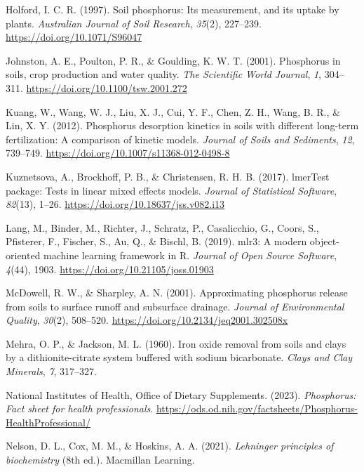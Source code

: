 \documentclass[
  a4paper,
]{article}
\newlength{\cslhangindent}
\newenvironment{CSLReferences}[2] %
 {\begin{list}{}{%
  \setlength{\itemindent}{0pt}
  \setlength{\leftmargin}{0pt}
  \setlength{\parsep}{0pt}
  \ifodd #1
   \setlength{\leftmargin}{\cslhangindent}
   \setlength{\itemindent}{-1\cslhangindent}
  \fi
  \setlength{\itemsep}{#2\baselineskip}}}
 {\end{list}}
\begin{document}
\begin{CSLReferences}{1}{0}
Holford, I. C. R. (1997). Soil phosphorus: Its measurement, and its
uptake by plants. \emph{Australian Journal of Soil Research},
\emph{35}(2), 227--239. \url{https://doi.org/10.1071/S96047}

Johnston, A. E., Poulton, P. R., \& Goulding, K. W. T. (2001).
Phosphorus in soils, crop production and water quality. \emph{The
Scientific World Journal}, \emph{1}, 304--311.
\url{https://doi.org/10.1100/tsw.2001.272}

Kuang, W., Wang, W. J., Liu, X. J., Cui, Y. F., Chen, Z. H., Wang, B.
R., \& Lin, X. Y. (2012). Phosphorus desorption kinetics in soils with
different long-term fertilization: A comparison of kinetic models.
\emph{Journal of Soils and Sediments}, \emph{12}, 739--749.
\url{https://doi.org/10.1007/s11368-012-0498-8}

Kuznetsova, A., Brockhoff, P. B., \& Christensen, R. H. B. (2017).
lmerTest package: Tests in linear mixed effects models. \emph{Journal of
Statistical Software}, \emph{82}(13), 1--26.
\url{https://doi.org/10.18637/jss.v082.i13}

Lang, M., Binder, M., Richter, J., Schratz, P., Casalicchio, G., Coors,
S., Pfisterer, F., Fischer, S., Au, Q., \& Bischl, B. (2019). {mlr3}: A
modern object-oriented machine learning framework in {R}. \emph{Journal
of Open Source Software}, \emph{4}(44), 1903.
\url{https://doi.org/10.21105/joss.01903}

McDowell, R. W., \& Sharpley, A. N. (2001). Approximating phosphorus
release from soils to surface runoff and subsurface drainage.
\emph{Journal of Environmental Quality}, \emph{30}(2), 508--520.
\url{https://doi.org/10.2134/jeq2001.302508x}

Mehra, O. P., \& Jackson, M. L. (1960). Iron oxide removal from soils
and clays by a dithionite-citrate system buffered with sodium
bicarbonate. \emph{Clays and Clay Minerals}, \emph{7}, 317--327.

National Institutes of Health, Office of Dietary Supplements. (2023).
\emph{Phosphorus: Fact sheet for health professionals}.
\url{https://ods.od.nih.gov/factsheets/Phosphorus-HealthProfessional/}

Nelson, D. L., Cox, M. M., \& Hoskins, A. A. (2021). \emph{Lehninger
principles of biochemistry} (8th ed.). Macmillan Learning.


\end{CSLReferences}
\end{document}
